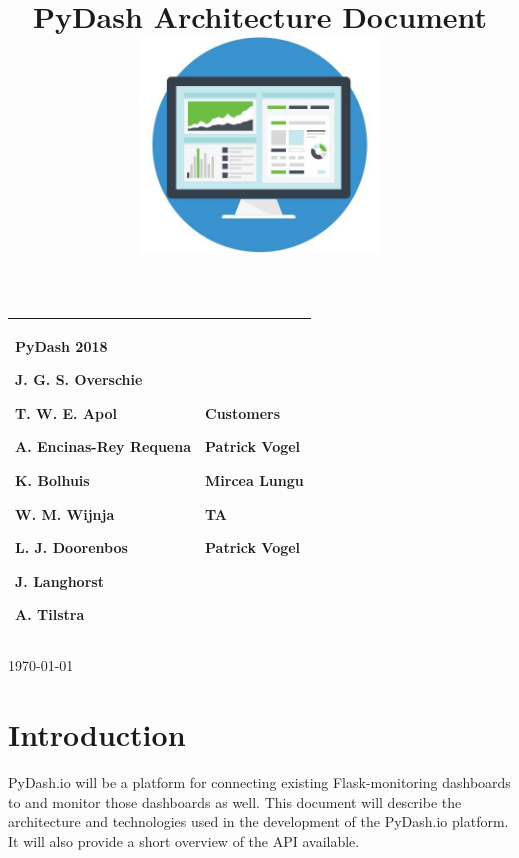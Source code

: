 
\title{ PyDash Architecture Document  \\ \includegraphics[width=2.50746in,height=2.26563in]{media/image24.jpg}}

\begin{longtable}[]{@{}ll@{}}
\toprule
\endhead
\begin{minipage}[t]{0.47\columnwidth}\raggedright
\textbf{PyDash 2018}

J. G. S. Overschie

T. W. E. Apol

A. Encinas-Rey Requena

K. Bolhuis

W. M. Wijnja

L. J. Doorenbos

J. Langhorst

A. Tilstra\strut
\end{minipage} & \begin{minipage}[t]{0.47\columnwidth}\raggedright
\textbf{Customers}

Patrick Vogel

Mircea Lungu

\textbf{TA}

Patrick Vogel\strut
\end{minipage}\tabularnewline
\bottomrule
\end{longtable}

\today

\pagebreak

\tableofcontents

\hypertarget{introduction}{%
\section{Introduction}\label{introduction}}

PyDash.io will be a platform for connecting existing Flask-monitoring
dashboards to and monitor those dashboards as well. This document will
describe the architecture and technologies used in the development of
the PyDash.io platform. It will also provide a short overview of the API
available.

